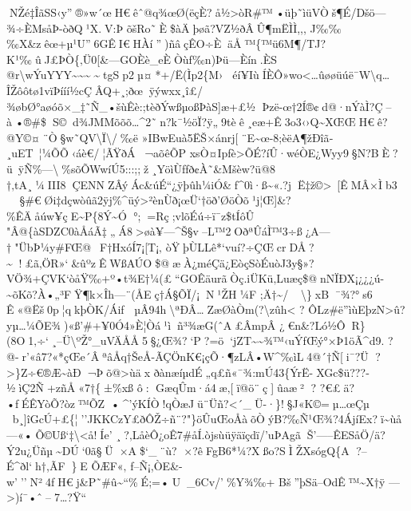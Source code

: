 NŽé‡ÎãS\textquotesingle\textquotesingle S‹y''®»w´œH€êˆ@q¾œØ(ëçÈ?å½\textgreater òR\#™•üþ˜ìüVÒš¶É/Dšö---¾÷ÈMsåÞ-òðQ¹X.V:Þ
õšRo˜È\$àÄþøã?V­Z½ðÂÛ¶mËÌÌ,,,
J‰‰‰X\&zêœ+µ¹U''6GÊI€HÀí'')ñâçÊO÷ÈäÅ™\{™ü6M¶/TJ?K¹‰ûJ£ÞÒ\{‚Ü0{[}\&­---GOÈè\_eÈÒùf‰n)Þü---Èín.ÈS
@r\textbackslash wÝuYYY\textasciitilde\textasciitilde\textasciitilde\textasciitildetgSp2µ¤*+/Ë(Ìp2\{M›éí¥IùÍÈÔ»wo\textless\ldots ûøøüúë¯W\textbackslash q\ldots ÎŽôôtø1vïÞííí½cÇÂQ+¸;ð\textquotesingle œÿýwxx¸î£/¾øbØ°aøóõ×\_‡˜Ñ\_•šùÊè:;tèðÝwßµoßÞàS{]}æ+£½
Þzë-œ†2Í®¢d@·nÝàÌ?Ç--à•®\#\$S©d¾JMMõõõ\ldots\^{}2˜n?k¯½öÏ?ÿ„9tè ê¸eæ+Ê3o3‹›Q\textasciitilde XŒŒH€ê?@Y©¤¨Ò§w˜QV\textbackslash Ï\textbackslash/‰ë
»IBwEuà5ËŠ×ánrj{[}¨E\textasciitilde œ-8;èëA¶žÐîã­¸uET~¦¼ÕÕ‹áè€/¦ÃŸðÁ¬aõêÕP
xsÒ¤Ipƒè\textgreater ÕÉ?íÛ·wéÒE¿Wyy9\textbar§N?BÈ?ü~ÿÑ\%---\textbackslash\%sõÕWwíÚ5:::;;ž¸YöìÙƒfð¢À˜\&Mšèw?ü@8
†‚tA¸¼III8ÇENNZÂýÁc\&úÉ``\textquotesingle¿ÿþûh¼iÓ\&\textquotesingle ƒ\^{}0ì·ß\textasciitilde«.?jË‡ž©\textgreater~{[}ÊMÂ×Ìb3

§\#€Øi‡dçwòûã2ÿj\%\^{}üý\textgreater²ènÙð¡œÜ`†öð'ØöÒõ¹j¦Œ{]}\&?\%ÊÄåúw¥çE\textasciitilde P\{8Ý\textasciitilde Ó
°;=Rç;vlõÉú÷ï¯z\$tÍôÛ
"Â@\{àSDZC0àÅáÃ‡„Á8\textgreater øà¥---\^{}Š§v--L™2OðªÛáÌ™3÷ß¿A---†"ÜbÞ¼y\#FŒ@~F†HxóÍ7¡{[}T¡‚
òŸþÙLLê*`vuí?÷ÇŒcrDÅ?\textasciitilde!£ã‚ÖR»`\&ûºzÊWßAÚO\$@æÀ¿méÇä¿EòçSòÉuòJ3y§»\textbar?VÖ¾+ÇVK`òåŸ‰+º•t¾E†¼(£``GOÊäurãÒç.iÜKü‚Luæç\$@nN ÏÐX¡¿¿¿ú-\textasciitilde õKõ?À•„³FŸ¶k×Îh---¨(ÅEç†Á§ÕÏ/¡N¹ŽH¼F
;Ä†\textasciitilde/\textbackslash\}xB¯¾?°s6 Ê«@Ëš0p­¦qkþÒK/Áiƒ
µÂ94h\textbackslash ªÐÂ\ldotsZæØàÒm(?\textbackslash zûh\textless{} ? 
ÔL z\#ë''ìùEþzN\textgreater û?yµ\ldots¼ÕE¾)«ß'\#+¥0Ó4»È¦Òá¹ìñ³¾æG(ˆA£Â mpÂ
¿€n\&?L­ó½ÔR\}(8O1‚÷`¸--Ü\textbackslash ºŽ°\_uVÄÅÅ5§¿Œ¾?`P?=ö`jZT\textasciitilde\textasciitilde¾™‹uÝfŒý°×Þ1öÃ\^{}d9.
?@-r'«â7?«*çŒe´ÂªâÅq†ŠeÅ-ÃÇÖnK€¡çÕ·¶zLÂ•W\^{}‰ìL4@´†Ñ{[}i¯?Ü
?\textgreater\}Z÷€®Æ\textasciitilde àÐ¬Þõ@\textgreater ùäx
ðànæíµdÉ„q£ñ«¯¾:mÚ43\{ÝrË-XGc\$ü???­½ìÇ2Ñ+zñÅ«7†\{±\%xß ô:
G­æqÛm·á4æ‚{[}ï@ö¨ç{]}ûaæ² ? 
?€£ä?•ƒÉÊYòÕ?òz™ÕZ•\^{}'ýKÍÒ!qÒæJü¨Üñ?\textless´\_Ü-·\}!§J«K©=µ\ldots œÇµ
b¸{]}îGcÚ+£\{¦''JKKCzY£ðÔŽ÷ñ¨?"\}öÛuŒoÅàõÒýB?‰Ñ¹Œ¾?4ÁjíEx?ï\textasciitilde ùå---«•Õ©Uß`‡\textbackslash\textless\textbar å!Íe' 
¸?‚LåèÔ¿oÊ7\#åÍ.òjsùüÿäïçdï/'uÞAgãŠ'-----ÊESåÖ/ä?Ý2u¿Üñµ\textasciitilde DÚ`0ã§Ü×A\$`\_¨ù?
×?êFgB6*¼?X\textbar ßo?SÌ­ŽXsógQ\{A ?--É\^{}ðl`h†,ÃF\}E ÕÆF«‚
ƒ--Ñ¡,ÒE\&-w'''N²4ƒH€j\&P˜\#û\textasciitilde``\%É;=•U\_6Cv/'\%Y¾‰+
Bš''þSä--OdÊ™\textasciitilde X†ÿ ---\textgreater)í¯•ˆ--7\ldots?Ÿ`` 
